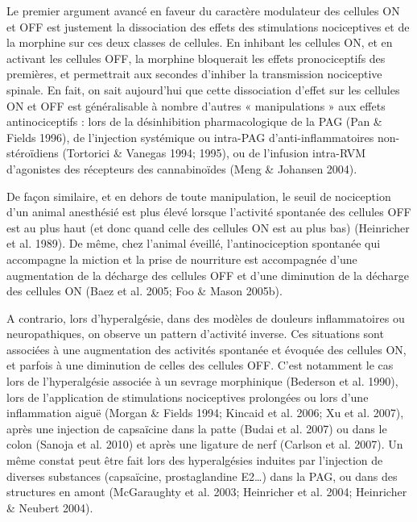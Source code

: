 \documentclass[a4paper,12pt,twoside]{report}
\begin{document}
Le premier argument avancé en faveur du caractère modulateur des cellules ON et OFF est justement la dissociation des effets des stimulations nociceptives et de la morphine sur ces deux classes de cellules. En inhibant les cellules ON, et en activant les cellules OFF, la morphine bloquerait les effets pronociceptifs des premières, et permettrait aux secondes d’inhiber la transmission nociceptive spinale. En fait, on sait aujourd’hui que cette dissociation d’effet sur les cellules ON et OFF est généralisable à nombre d’autres « manipulations » aux effets antinociceptifs : lors de la désinhibition pharmacologique de la PAG (Pan \& Fields 1996), de l’injection systémique ou intra-PAG d’anti-inflammatoires non-stéroïdiens (Tortorici \& Vanegas 1994; 1995), ou de l’infusion intra-RVM d’agonistes des récepteurs des cannabinoïdes (Meng \& Johansen 2004).

De façon similaire, et en dehors de toute manipulation, le seuil de nociception d’un animal anesthésié est plus élevé lorsque l’activité spontanée des cellules OFF est au plus haut (et donc quand celle des cellules ON est au plus bas) (Heinricher et al. 1989). De même, chez l’animal éveillé, l’antinociception spontanée qui accompagne la miction et la prise de nourriture est accompagnée d’une augmentation de la décharge des cellules OFF et d’une diminution de la décharge des cellules ON (Baez et al. 2005; Foo \& Mason 2005b).

\bigskip 

A contrario, lors d’hyperalgésie, dans des modèles de douleurs inflammatoires ou neuropathiques, on observe un pattern d’activité inverse. Ces situations sont associées à une augmentation des activités spontanée et évoquée des cellules ON, et parfois à une diminution de celles des cellules OFF. C’est notamment le cas lors de l’hyperalgésie associée à un sevrage morphinique (Bederson et al. 1990), lors de l’application de stimulations nociceptives prolongées ou lors d’une inflammation aiguë (Morgan \& Fields 1994; Kincaid et al. 2006; Xu et al. 2007), après une injection de capsaïcine dans la patte (Budai et al. 2007) ou dans le colon (Sanoja et al. 2010) et après une ligature de nerf (Carlson et al. 2007). Un même constat peut être fait lors des hyperalgésies induites par l’injection de diverses substances (capsaïcine, prostaglandine E2\ldots) dans la PAG, ou dans des structures en amont (McGaraughty et al. 2003; Heinricher et al. 2004; Heinricher \& Neubert 2004).

\bigskip
\end{document}
